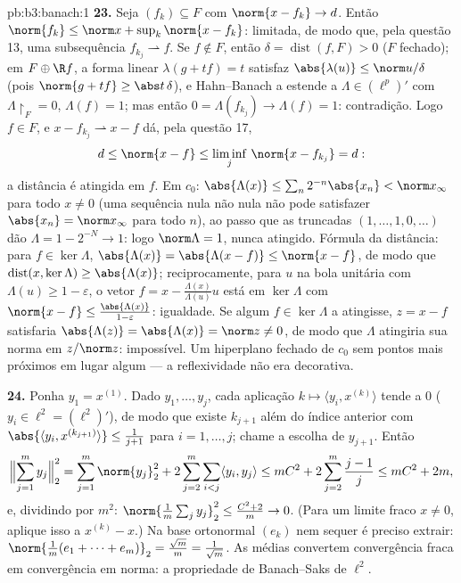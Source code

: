 \begin{solution}{pb:b3:banach:1}
\textbf{23.} Seja $(f_k) \subseteq F$ com $\norm{x - f_k}
\to d$. Então $\norm{f_k} \leq \norm x + \sup_k\norm{x -
f_k}$: limitada, de modo que, pela questão 13, uma subsequência $f_{k_j}
\rightharpoonup f$. Se $f \notin F$, então $\delta =
\operatorname{dist}(f, F) > 0$ ($F$ fechado); em $F \oplus \R
f$, a forma linear $\lambda(g + tf) = t$ satisfaz
$\abs{\lambda(u)} \leq \norm u/\delta$ (pois $\norm{g +
tf} \geq \abs t\,\delta$), e Hahn--Banach a estende a
$\Lambda \in (\ell^p)'$ com $\Lambda\restriction_F = 0$,
$\Lambda(f) = 1$; mas então $0 = \Lambda(f_{k_j}) \to
\Lambda(f) = 1$: contradição. Logo $f \in F$, e $x -
f_{k_j} \rightharpoonup x - f$ dá, pela questão 17,
\[
d \leq \norm{x - f} \leq \liminf_j\,\norm{x - f_{k_j}} = d :
\]
a distância é atingida em $f$. Em $c_0$: $\abs{\Lambda(x)}
\leq \sum_n2^{-n}\abs{x_n} < \norm x_\infty$ para todo $x
\neq 0$ (uma sequência nula não nula não pode satisfazer $\abs{x_n} =
\norm x_\infty$ para todo $n$), ao passo que as truncadas $(1,
\dots, 1, 0, \dots)$ dão $\Lambda = 1 - 2^{-N} \to 1$: logo
$\norm\Lambda = 1$, nunca atingido. Fórmula da distância: para $f
\in \ker\Lambda$, $\abs{\Lambda(x)} = \abs{\Lambda(x - f)}
\leq \norm{x - f}$, de modo que $\operatorname{dist}(x, \ker\Lambda)
\geq \abs{\Lambda(x)}$; reciprocamente, para $u$ na bola unitária
com $\Lambda(u) \geq 1 - \varepsilon$, o vetor $f = x -
\frac{\Lambda(x)}{\Lambda(u)}u$ está em $\ker\Lambda$ com
$\norm{x - f} \leq \frac{\abs{\Lambda(x)}}{1 - \varepsilon}$:
igualdade. Se algum $f \in \ker\Lambda$ a atingisse, $z = x -
f$ satisfaria $\abs{\Lambda(z)} = \abs{\Lambda(x)} =
\norm z \neq 0$, de modo que $\Lambda$ atingiria sua norma em
$z/\norm z$: impossível. Um hiperplano fechado de $c_0$ sem
pontos mais próximos em lugar algum --- a reflexividade não era decorativa.

\textbf{24.} Ponha $y_1 = x^{(1)}$. Dado $y_1, \dots, y_j$,
cada aplicação $k \mapsto \langle y_i, x^{(k)}\rangle$ tende a $0$
($y_i \in \ell^2 = (\ell^2)'$), de modo que existe $k_{j+1}$ além
do índice anterior com $\abs{\langle y_i,
x^{(k_{j+1})}\rangle} \leq \frac1{j+1}$ para $i = 1, \dots,
j$; chame a escolha de $y_{j+1}$. Então
\[
\Bigl\lVert\sum_{j=1}^my_j\Bigr\rVert_2^2
= \sum_{j=1}^m\norm{y_j}_2^2
+ 2\sum_{j=2}^m\sum_{i<j}\langle y_i, y_j\rangle
\leq mC^2 + 2\sum_{j=2}^m\frac{j-1}j
\leq mC^2 + 2m,
\]
e, dividindo por $m^2$: $\norm{\frac1m\sum_jy_j}_2^2 \leq
\frac{C^2 + 2}m \to 0$. (Para um limite fraco $x \neq 0$, aplique
isso a $x^{(k)} - x$.) Na base ortonormal $(e_k)$ nem sequer é preciso
extrair: $\norm{\frac1m(e_1 + \dots +
e_m)}_2 = \frac{\sqrt m}m = \frac1{\sqrt m}$. As médias
convertem convergência fraca em convergência em norma: a
propriedade de Banach--Saks de $\ell^2$.


\end{solution}
